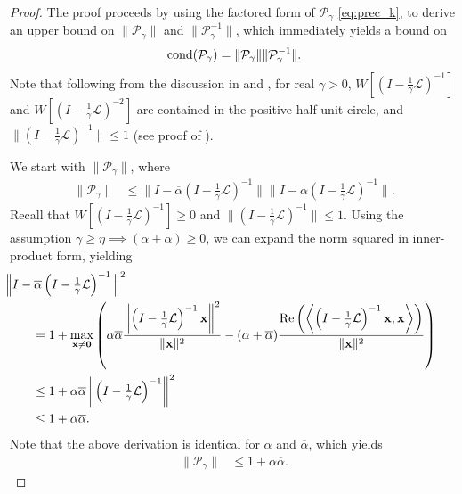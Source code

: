 \documentclass[review]{siamart}
\begin{document}
\begin{proof}
The proof proceeds by using the factored form of $\mathcal{P}_\gamma$ \eqref{eq:prec_k},
to derive an upper bound on $\|\mathcal{P}_\gamma\|$ and $\|\mathcal{P}_\gamma^{-1}\|$,
which immediately yields a bound on
%
\begin{align}\label{eq:cond0}
\textnormal{cond}(\mathcal{P}_\gamma) = \|\mathcal{P}_\gamma\|\|\mathcal{P}_\gamma^{-1}\|.
\end{align}
%
Note that following from the discussion in  and ,
for real $\gamma>0$, $W\left[(I - \tfrac{1}{\gamma}\mathcal{L})^{-1}\right]$ and
$W\left[(I - \tfrac{1}{\gamma}\mathcal{L})^{-2}\right]$ are contained in
the positive half unit circle, and $\|(I - \tfrac{1}{\gamma}\mathcal{L})^{-1}\| \leq 1$
(see proof of ).

We start with $\|\mathcal{P}_\gamma\|$, where
%
\begin{align}\label{eq:CS}
\|\mathcal{P}_\gamma\| & \leq
	\Big\|I - \overline{\alpha}\left(I - \tfrac{1}{\gamma}\mathcal{L}\right)^{-1}\Big\|
	\Big\|I - \alpha\left(I - \tfrac{1}{\gamma}\mathcal{L}\right)^{-1}\Big\|.
\end{align}
%
Recall that $W\left[(I - \tfrac{1}{\gamma}\mathcal{L})^{-1}\right] \geq 0$
and $\|(I - \tfrac{1}{\gamma}\mathcal{L})^{-1}\| \leq 1$. Using the
assumption $\gamma \geq \eta \implies(\alpha+\overline{\alpha}) \geq 0$,
we can expand the norm squared in inner-product form, yielding
%
\begin{align*}
&\hspace{-5ex}
\Big\|I - \overline{\alpha}\left(I - \tfrac{1}{\gamma}\mathcal{L}\right)^{-1}\Big\|^2 \\
	& = 1 + \max_{\mathbf{x}\neq\mathbf{0}} \left( \alpha\overline{\alpha}
		\frac{\left\|\left(I - \tfrac{1}{\gamma}\mathcal{L}\right)^{-1}\mathbf{x}\right\|^2
		}{\|\mathbf{x}\|^2}
	- (\alpha + \overline{\alpha})\frac{\textnormal{Re}\left(\left\langle\left(I -
		\tfrac{1}{\gamma}\mathcal{L}\right)^{-1}\mathbf{x}, \mathbf{x}\right\rangle\right)}
		{\|\mathbf{x}\|^2}\right) \\
& \leq 1 + \alpha\overline{\alpha}\left\|\left(I - \tfrac{1}{\gamma}\mathcal{L}\right)^{-1}\right\|^2 \\
& \leq 1 + \alpha\overline{\alpha}.
\end{align*}
%
Note that the above derivation is identical for $\alpha$ and $\overline{\alpha}$,
which yields
%
\begin{align} \label{eq:upper_alpha}
\|\mathcal{P}_\gamma\| & \leq 1 + \alpha\overline{\alpha}.
\end{align}
%


\end{proof}
\end{document}
